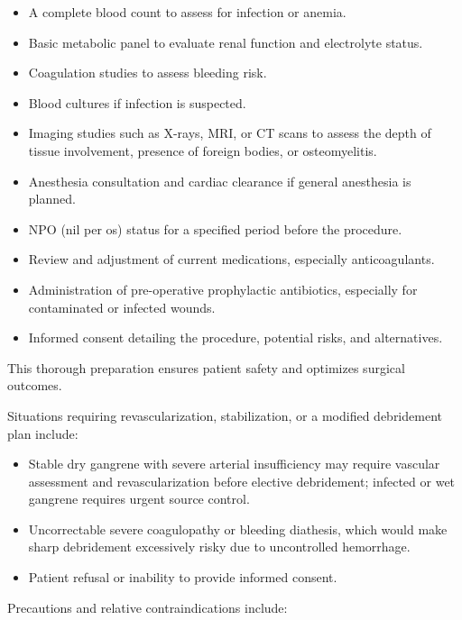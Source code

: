 \begin{itemize}
  \item A complete blood count to assess for infection or anemia.
  \item Basic metabolic panel to evaluate renal function and electrolyte status.
  \item Coagulation studies to assess bleeding risk.
  \item Blood cultures if infection is suspected.
  \item Imaging studies such as X-rays, MRI, or CT scans to assess the depth of tissue involvement, presence of foreign bodies, or osteomyelitis.
  \item Anesthesia consultation and cardiac clearance if general anesthesia is planned.
  \item NPO (nil per os) status for a specified period before the procedure.
  \item Review and adjustment of current medications, especially anticoagulants.
  \item Administration of pre-operative prophylactic antibiotics, especially for contaminated or infected wounds.
  \item Informed consent detailing the procedure, potential risks, and alternatives.
\end{itemize}

This thorough preparation ensures patient safety and optimizes surgical outcomes.

Situations requiring revascularization, stabilization, or a modified debridement plan include:

\begin{itemize}
  \item Stable dry gangrene with severe arterial insufficiency may require vascular assessment and revascularization before elective debridement; infected or wet gangrene requires urgent source control.
  \item Uncorrectable severe coagulopathy or bleeding diathesis, which would make sharp debridement excessively risky due to uncontrolled hemorrhage.
  \item Patient refusal or inability to provide informed consent.
\end{itemize}

Precautions and relative contraindications include:

